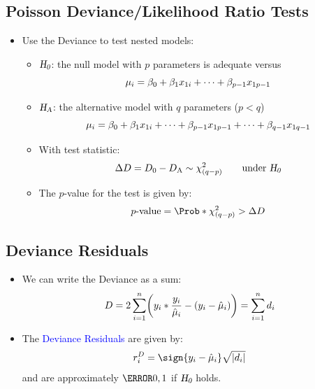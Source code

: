 \documentclass[oneside]{book}\usepackage[]{graphicx}\usepackage[svgnames]{xcolor}
\let\log\relax%
\newcommand{\HN}{\textsl{H}_{\textsl{0}}}%
\newcommand{\HA}{\textsl{H}_{\textsl{A}}}%
\DeclarePairedDelimiter\abs{\lvert}{\rvert}
\begin{document}
\subsection*{Poisson Deviance/Likelihood Ratio Tests}
\begin{itemize}
      \item Use the Deviance to test nested models:
            \begin{itemize}
                  \item $ \HN $: the null model with $ p $ parameters is adequate versus
                        \[ \log{\mu_i}=\beta_0+\beta_1x_{1i}+\cdots+\beta_{p-1}x_{1p-1} \]
                  \item $ \HA $: the alternative model with $ q $ parameters ($ p<q $)
                        \[ \log{\mu_i}=\beta_0+\beta_1x_{1i}+\cdots+\beta_{p-1}x_{1p-1}+\cdots+\beta_{q-1}x_{1q-1} \]
                  \item With test statistic:
                        \[ \Delta D=D_0-D_\text{A} \sim \chi^2_{(q-p)}\qquad\text{under $ \HN $} \]
                  \item The $p$-value for the test is given by:
                        \[ p\text{-value}=\Prob*{\chi^2_{(q-p)}>\Delta D} \]
            \end{itemize}
\end{itemize}
\subsection*{Deviance Residuals}
\begin{itemize}
      \item We can write the Deviance as a sum:
            \[ D=2 \sum_{i=1}^{n}\biggl(y_i\log*{\frac{y_i}{\hat{\mu}_i}}-(y_i-\hat{\mu}_i)\biggr)=\sum_{i=1}^{n} d_i \]
      \item The \textcolor{Blue}{Deviance Residuals} are given by:
            \[ r_i^D=\sign{y_i-\hat{\mu}_i}\sqrt{\abs{d_i}} \]
            and are approximately $ \N{0,1} $ if $ \HN $ holds.
\end{itemize}
\end{document}
